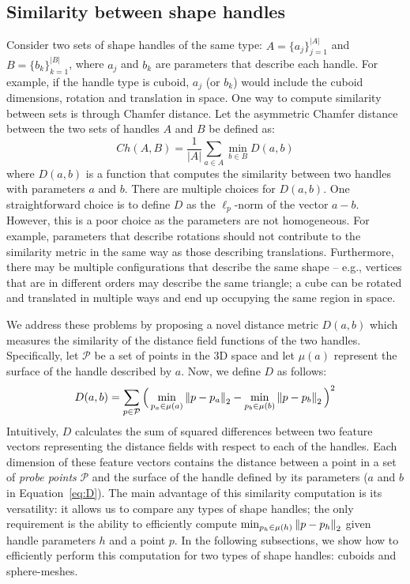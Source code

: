 \subsection{Similarity between shape handles}
\label{sec:similarity}

Consider two sets of shape handles of the same type: $A=\{a_j\}_{j=1}^{|A|}$ and $B=\{b_k\}_{k=1}^{|B|}$, where
$a_j$ and $b_k$ are parameters that describe each handle.
For example, if the handle type is cuboid, $a_j$ (or $b_k$) would include the cuboid dimensions,
rotation and translation in space.  %
One way to compute similarity between sets is through Chamfer distance.
Let the asymmetric Chamfer distance between the two sets of
handles $A$ and $B$ be defined as:
\begin{equation}
    \label{eq:ch}
    Ch(A, B) = \frac{1}{|A|}\sum_{a \in A} \min_{b \in B} D(a, b)
\end{equation}
where $D(a,b)$ is a function that computes the similarity between two handles with
parameters $a$ and $b$.
There are multiple choices for $D(a,b)$.
One straightforward choice is to define $D$ as the $\ell_p$-norm of the vector $a-b$.
However, this is a poor choice as the parameters are not homogeneous. For example, parameters that describe rotations should
not contribute to the similarity metric in the same way as those describing translations.
Furthermore, there may be multiple configurations that describe the same shape -- 
e.g., vertices that are in different orders may describe the same triangle; a cube can be rotated and translated
in multiple ways and end up occupying the same region in space.

We address these problems by proposing a novel distance metric $D(a,b)$ which measures the similarity of the distance field functions of the two handles.
Specifically, let $\mathcal{P}$ be a set of points in the 3D space and let $\mu({a})$ represent the surface of the handle described by $a$.
Now, we define $D$ as follows:
\begin{equation}
    \label{eq:D}
    D(a,b) = \sum_{p \in \mathcal{P}} \Big(\min_{p_a \in \mu(a)}\left\lVert p-p_a\right\rVert_2 - \min_{p_b \in \mu(b)}\left\lVert p-p_b\right\rVert_2\Big)^2
\end{equation}
Intuitively, %
$D$ calculates the sum of squared differences between two
feature vectors representing the distance fields with respect to each of the handles.
Each dimension of these feature vectors contains the distance between a point in
a set of \emph{probe points} $\mathcal{P}$ and the surface of the handle 
defined by its parameters ($a$ and $b$ in Equation~\ref{eq:D}).
The main advantage of this similarity computation is its versatility:
it allows us to compare any types of shape handles; the only requirement
is the ability to efficiently compute $\min_{p_h \in \mu(h)}\left\lVert p-p_h\right\rVert_2$ given
handle parameters $h$ and a point $p$.
In the following subsections, we show how to efficiently perform this computation
for two types of shape handles: cuboids and sphere-meshes.

